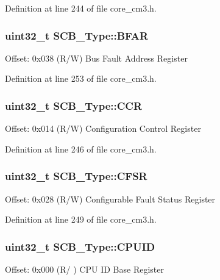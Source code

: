 \-Definition at line 244 of file core\-\_\-cm3.\-h.

\hypertarget{struct_s_c_b___type_a31f79afe86c949c9862e7d5fce077c3a}{
\subsubsection[{\-B\-F\-A\-R}]{ uint32\-\_\-t {\bf \-S\-C\-B\-\_\-\-Type\-::\-B\-F\-A\-R}}}\label{struct_s_c_b___type_a31f79afe86c949c9862e7d5fce077c3a}
\-Offset\-: 0x038 (\-R/\-W) \-Bus \-Fault \-Address \-Register 

\-Definition at line 253 of file core\-\_\-cm3.\-h.

\hypertarget{struct_s_c_b___type_a6d273c6b90bad15c91dfbbad0f6e92d8}{
\subsubsection[{\-C\-C\-R}]{ uint32\-\_\-t {\bf \-S\-C\-B\-\_\-\-Type\-::\-C\-C\-R}}}\label{struct_s_c_b___type_a6d273c6b90bad15c91dfbbad0f6e92d8}
\-Offset\-: 0x014 (\-R/\-W) \-Configuration \-Control \-Register 

\-Definition at line 246 of file core\-\_\-cm3.\-h.

\hypertarget{struct_s_c_b___type_a2f94bf549b16fdeb172352e22309e3c4}{
\subsubsection[{\-C\-F\-S\-R}]{ uint32\-\_\-t {\bf \-S\-C\-B\-\_\-\-Type\-::\-C\-F\-S\-R}}}\label{struct_s_c_b___type_a2f94bf549b16fdeb172352e22309e3c4}
\-Offset\-: 0x028 (\-R/\-W) \-Configurable \-Fault \-Status \-Register 

\-Definition at line 249 of file core\-\_\-cm3.\-h.

\hypertarget{struct_s_c_b___type_afa7a9ee34dfa1da0b60b4525da285032}{
\subsubsection[{\-C\-P\-U\-I\-D}]{ uint32\-\_\-t {\bf \-S\-C\-B\-\_\-\-Type\-::\-C\-P\-U\-I\-D}}}\label{struct_s_c_b___type_afa7a9ee34dfa1da0b60b4525da285032}
\-Offset\-: 0x000 (\-R/ ) \-C\-P\-U \-I\-D \-Base \-Register 

